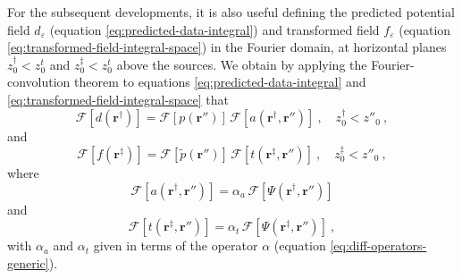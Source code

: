 For the subsequent developments, it is also useful defining the predicted potential field 
$d_{\varepsilon}$ (equation \ref{eq:predicted-data-integral}) and transformed field
$f_{\varepsilon}$ (equation \ref{eq:transformed-field-integral-space}) in the Fourier domain,
at horizontal planes $z^{\dagger}_{0} < z^{t}_{0}$ and $z^{\ddagger}_{0} < z^{t}_{0}$ 
above the sources. 
We obtain by applying the Fourier-convolution theorem to 
equations \ref{eq:predicted-data-integral} and \ref{eq:transformed-field-integral-space} that
\begin{equation}
	\mathcal{F} [ d(\mathbf{r}^{\dagger}) ] =
	\mathcal{F} [ p(\mathbf{r}'') ] \, 
	\mathcal{F} [ a(\mathbf{r}^{\dagger}, \mathbf{r}'') ] \: ,
	\quad z^{\dagger}_{0} < z''_{0} \: ,
	\label{eq:eqlayer-integral-Fourier}
\end{equation}
and
\begin{equation}
	\mathcal{F} [ f(\mathbf{r}^{\ddagger}) ] =
	\mathcal{F} [ \tilde{p}(\mathbf{r}'') ] \, 
	\mathcal{F} [ t(\mathbf{r}^{\ddagger}, \mathbf{r}'') ] \: ,
	\quad z^{\ddagger}_{0} < z''_{0} \: ,
	\label{eq:transformed-field-integral-Fourier}
\end{equation}
where
\begin{equation}
	\mathcal{F} [ a(\mathbf{r}^{\dagger}, \mathbf{r}'') ] =
	\alpha_{a} \, 
	\mathcal{F} [ \Psi(\mathbf{r}^{\dagger}, \mathbf{r}'') ]
	\label{eq:kernel-Fourier}
\end{equation}
and
\begin{equation}
	\mathcal{F} [ t(\mathbf{r}^{\ddagger}, \mathbf{r}'') ] =
	\alpha_{t} \, 
	\mathcal{F} [ \Psi(\mathbf{r}^{\ddagger}, \mathbf{r}'') ] \: ,
	\label{eq:kernel-transformation-Fourier}
\end{equation}
with $\alpha_{a}$ and $\alpha_{t}$ given in terms of the operator 
$\alpha$ (equation \ref{eq:diff-operators-generic}).